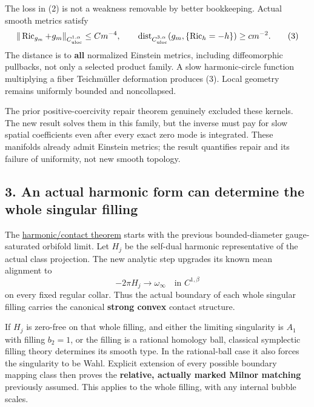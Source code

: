\documentclass[
  11pt,
]{article}
\begin{document}
The loss in (2) is not a weakness removable by better bookkeeping.
Actual smooth metrics satisfy \[
 \|\operatorname{Ric}_{g_m}+g_m\|_{C^{1,\alpha}_{\rm uloc}}
       \le C m^{-4},\qquad
 \operatorname{dist}_{C^{3,\alpha}_{\rm uloc}}
       (g_m,\{\operatorname{Ric}_h=-h\})\ge c m^{-2}.          \tag{3}
\] The distance is to \textbf{all} normalized Einstein metrics,
including diffeomorphic pullbacks, not only a selected product family. A
slow harmonic-circle function multiplying a fiber Teichmüller
deformation produces (3). Local geometry remains uniformly bounded and
noncollapsed.

The prior positive-coercivity repair theorem genuinely excluded these
kernels. The new result solves them in this family, but the inverse must
pay for slow spatial coefficients even after every exact zero mode is
integrated. These manifolds already admit Einstein metrics; the result
quantifies repair and its failure of uniformity, not new smooth
topology.

\hypertarget{an-actual-harmonic-form-can-determine-the-whole-singular-filling}{%
\subsection{3. An actual harmonic form can determine the whole singular
filling}\label{an-actual-harmonic-form-can-determine-the-whole-singular-filling}}

The \href{20260924_harmonic_contact_milnor_matching.md}{harmonic/contact
theorem} starts with the previous bounded-diameter gauge-saturated
orbifold limit. Let \(H_j\) be the self-dual harmonic representative of
the actual class projection. The new analytic step upgrades its known
mean alignment to \[
               -2\pi H_j\longrightarrow\omega_\infty
                       \quad\text{in }C^{1,\beta}
\] on every fixed regular collar. Thus the actual boundary of each whole
singular filling carries the canonical \textbf{strong convex} contact
structure.

If \(H_j\) is zero-free on that whole filling, and either the limiting
singularity is \(A_1\) with filling \(b_2=1\), or the filling is a
rational homology ball, classical symplectic filling theory determines
its smooth type. In the rational-ball case it also forces the
singularity to be Wahl. Explicit extension of every possible boundary
mapping class then proves the \textbf{relative, actually marked Milnor
matching} previously assumed. This applies to the whole filling, with
any internal bubble scales.
\end{document}
